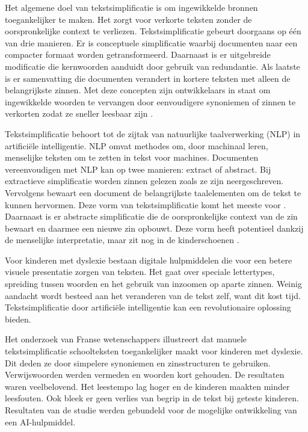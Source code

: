 Het algemene doel van tekstsimplificatie is om ingewikkelde bronnen toegankelijker te maken. Het zorgt voor verkorte teksten zonder de oorspronkelijke context te verliezen. Tekstsimplificatie gebeurt doorgaans op één van drie manieren. Er is conceptuele simplificatie waarbij documenten naar een compacter formaat worden getransformeerd. Daarnaast is er uitgebreide modificatie die kernwoorden aanduidt door gebruik van redundantie. Als laatste is er samenvatting die documenten verandert in kortere teksten met alleen de belangrijkste zinnen. Met deze concepten zijn ontwikkelaars in staat om ingewikkelde woorden te vervangen door eenvoudigere synoniemen of zinnen te verkorten zodat ze sneller leesbaar zijn \autocite{Siddharthan2014}.

Tekstsimplificatie behoort tot de zijtak van natuurlijke taalverwerking (NLP) in artificiële intelligentie. NLP omvat methodes om, door machinaal leren, menselijke teksten om te zetten in tekst voor machines. Documenten vereenvoudigen met NLP kan op twee manieren: extract of abstract. Bij extractieve simplificatie worden zinnen gelezen zoals ze zijn neergeschreven. Vervolgens bewaart een document de belangrijkste taalelementen om de tekst te kunnen hervormen. Deze vorm van tekstsimplificatie komt het meeste voor \autocite{Sciforce2020}. Daarnaast is er abstracte simplificatie die de oorspronkelijke context van de zin bewaart en daarmee een nieuwe zin opbouwt. Deze vorm heeft potentieel dankzij de menselijke interpretatie, maar zit nog in de kinderschoenen \autocite{Chowdhary2020}.


Voor kinderen met dyslexie bestaan digitale hulpmiddelen die voor een betere visuele presentatie zorgen van teksten. Het gaat over speciale lettertypes, spreiding tussen woorden en het gebruik van inzoomen op aparte zinnen. Weinig aandacht wordt besteed aan het veranderen van de tekst zelf, want dit kost tijd. Tekstsimplificatie door artificiële intelligentie kan een revolutionaire oplossing bieden. 

Het onderzoek van Franse wetenschappers \textcite{Gala2016} illustreert dat manuele tekstsimplificatie schoolteksten toegankelijker maakt voor kinderen met dyslexie. Dit deden ze door simpelere synoniemen en zinsstructuren te gebruiken. Verwijswoorden werden vermeden en woorden kort gehouden. De resultaten waren veelbelovend. Het leestempo lag hoger en de kinderen maakten minder leesfouten. Ook bleek er geen verlies van begrip in de tekst bij geteste kinderen. Resultaten van de studie werden gebundeld voor de mogelijke ontwikkeling van een AI-hulpmiddel.

